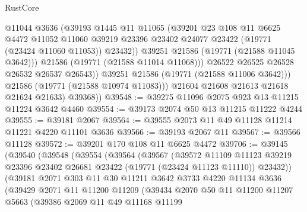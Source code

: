\begin{lexlean}{RustCore}
\begin{coremodule}
                      @11044
                      @3636
                      (@39193
                        @1445
                        @11
                        @11065
                        (@39201
                          @23
                          @108
                          @11
                          @6625
                          @4472
                          @11052
                          @11060
                          @39219
                          @23396
                          @23402
                          @24077
                          @23422
                          (@19771 (@23424 @11060 @11053))
                          @23432))
                      @39251
                      @21586
                      (@19771 (@21588 @11045 @3642)))
                    @21586
                    (@19771 (@21588 @11014 @11068)))
                  @26522
                  @26525
                  @26528
                  @26532
                  @26537
                  @26543))
              @39251
              @21586
              (@19771 (@21588 @11006 @3642)))
            @21586
            (@19771 (@21588 @10974 @11083)))
          @21604
          @21608
          @21613
          @21618
          @21624
          @21633)
        @39368))
@39548 := @39275 @11096 @2075 @923 @13 @11215 @11224 @3642 @4460
@39554 := @39173 @2074 @50 @13 @11215 @11222 @4244
@39555 := @39181 @2067
@39564 := @39555 @2073 @11 @49 @11128 @11214 @11221 @4220 @11101 @3636
@39566 := @39193 @2067 @11
@39567 := @39566 @11128
@39572 := @39201 @170 @108 @11 @6625 @4472
@39706 := @39145
    (@39540
      (@39548
        (@39554
          (@39564
            (@39567
              (@39572
                @11109
                @11123
                @39219
                @23396
                @23402
                @26681
                @23422
                (@19771 (@23424 @11123 @11110))
                @23432))
            (@39181
              @2071
              @303
              @11
              @30
              @11211
              @3642
              @3733
              @4220
              @11134
              @3636
              (@39429
                @2071
                @11
                @11200
                @11209
                (@39434
                  @2070
                  @50
                  @11
                  @11200
                  @11207
                  @5663
                  (@39386
                    @2069
                    @11
                    @49
                    @11168
                    @11199

\end{coremodule}
\end{lexlean}
